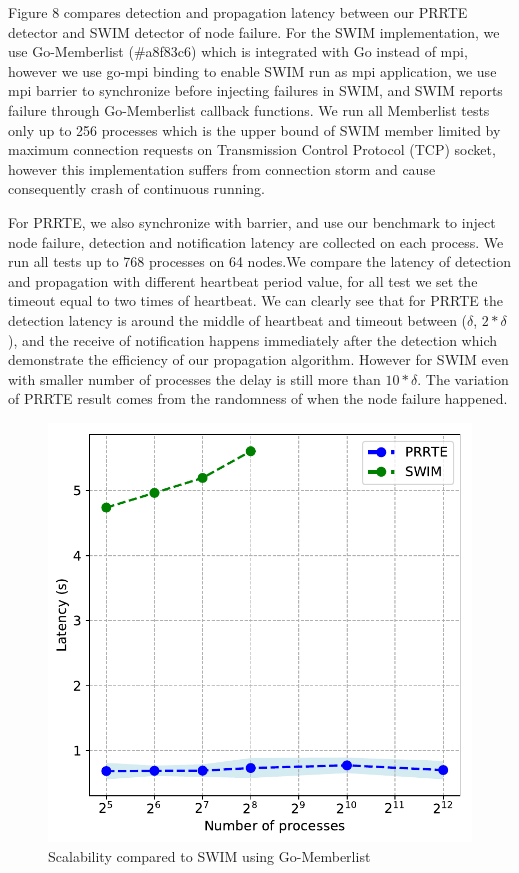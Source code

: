 \documentclass[sigconf]{acmart}
\begin{document}
Figure 8 compares detection and propagation latency between our PRRTE detector and SWIM detector of node failure. For the SWIM implementation, we use Go-Memberlist (\#a8f83c6) which is integrated with Go instead of mpi, however we use go-mpi binding to enable SWIM run as mpi application, we use mpi barrier to synchronize before injecting failures in SWIM, and SWIM reports failure through Go-Memberlist callback functions. We run all Memberlist tests only up to 256 processes which is the upper bound of SWIM member limited by maximum connection requests on Transmission Control Protocol (TCP) socket, however this implementation suffers from connection storm and cause consequently crash of continuous running. 

For PRRTE, we also synchronize with barrier, and use our benchmark to inject node failure, detection and notification latency are collected on each process. We run all tests up to 768 processes on 64 nodes.We compare the latency of detection and propagation with different heartbeat period value, for all test we set the timeout equal to two times of heartbeat. We can clearly see that for PRRTE the detection latency is around the middle of heartbeat and timeout between ($\delta$, $2*\delta$), and the receive of notification happens immediately after the detection which demonstrate the efficiency of our propagation algorithm. However for SWIM even with smaller number of processes the delay is still more than $10*\delta$. The variation of PRRTE result comes from the randomness of when the node failure happened.

\begin{figure}[h]
  \centering
  \includegraphics[width=\linewidth]{Scale_prrte_swim.pdf}
  \caption{Scalability compared to SWIM using Go-Memberlist}
\end{figure}
\end{document}
